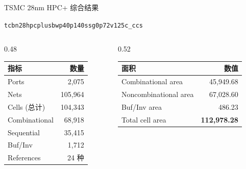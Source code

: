 \documentclass[aspectratio=169, 10pt, UTF8]{ctexbeamer}
\begin{document}
\begin{frame}{TSMC 28nm HPC+ 综合结果}
  \begin{center}
    {\footnotesize \texttt{tcbn28hpcplusbwp40p140ssg0p72v125c\_ccs}}
  \end{center}

  \begin{columns}[T]
    \begin{column}{0.48\textwidth}
      \begin{table}[h]
        \centering
        \footnotesize
        \begin{tabular}{lr}
          \toprule
          \textbf{指标} & \textbf{数量} \\
          \midrule
          Ports & 2,075 \\
          Nets & 105,964 \\
          Cells (总计) & 104,343 \\
          \quad Combinational & 68,918 \\
          \quad Sequential & 35,415 \\
          \quad Buf/Inv & 1,712 \\
          References & 24 种 \\
          \bottomrule
        \end{tabular}
      \end{table}
    \end{column}
    \begin{column}{0.52\textwidth}
      \begin{table}[h]
        \centering
        \footnotesize
        \begin{tabular}{lr}
          \toprule
          \textbf{面积} & \textbf{数值} \\
          \midrule
          Combinational area & 45,949.68 \\
          Noncombinational area & 67,028.60 \\
          Buf/Inv area & 486.23 \\
          \rowcolor{ieeeRed!10}
          Total cell area & \textbf{112,978.28} \\
          \bottomrule
        \end{tabular}
      \end{table}
    \end{column}
  \end{columns}


\end{frame}
\end{document}
